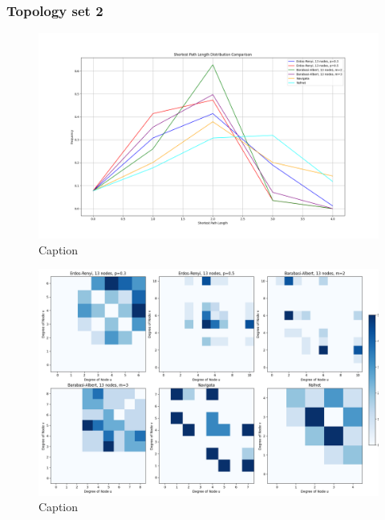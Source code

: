 \subsubsection{Topology set 2}
\begin{figure}
    \centering
    \includegraphics[width=0.9\linewidth]{images/FINAL-TOPO-COMP/line-13.png}
    \caption{Caption}
    \label{fig:enter-label}
\end{figure}

\begin{figure}
    \centering
    \includegraphics[width=0.9\linewidth]{images/FINAL-TOPO-COMP/Degree-correlation-matrices/13-matrix.png}
    \caption{Caption}
    \label{fig:enter-label}
\end{figure}

